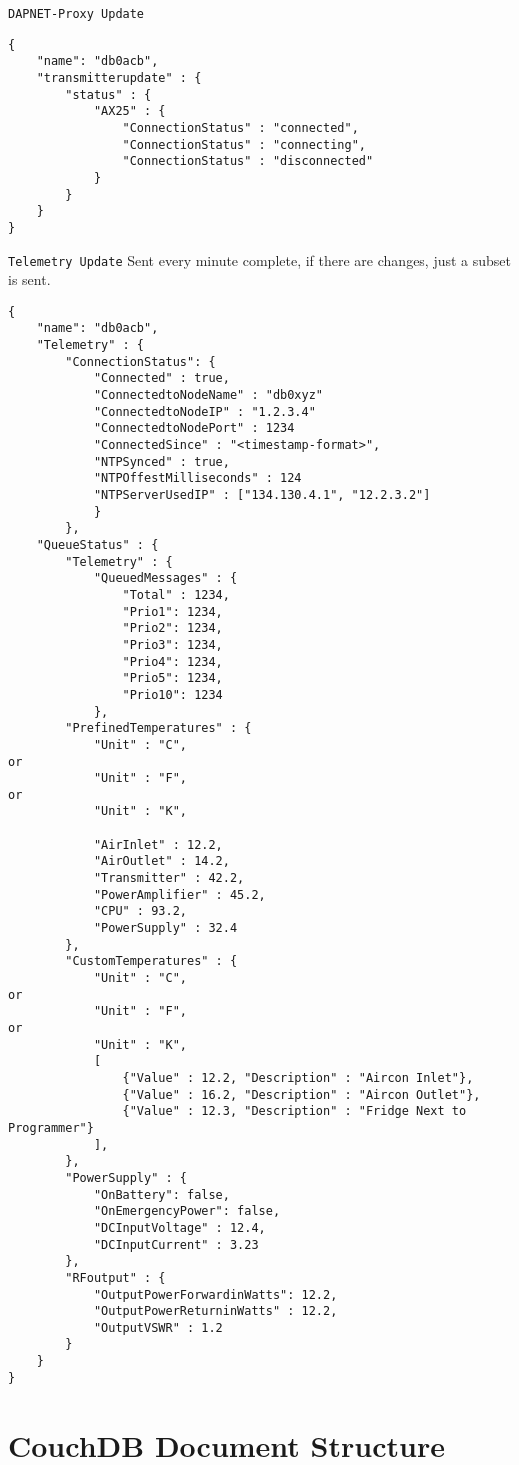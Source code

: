 \documentclass[a4paper]{article}
\begin{document}
\texttt{DAPNET-Proxy Update}
\begin{lstlisting}
{
    "name": "db0acb",
    "transmitterupdate" : {
        "status" : {
            "AX25" : {
                "ConnectionStatus" : "connected",
                "ConnectionStatus" : "connecting",
                "ConnectionStatus" : "disconnected"
            }
        }
    }
}
\end{lstlisting}

\texttt{Telemetry Update}
Sent every minute complete, if there are changes, just a subset is sent.
\begin{lstlisting}
{
    "name": "db0acb",
    "Telemetry" : {
        "ConnectionStatus": {
            "Connected" : true,
            "ConnectedtoNodeName" : "db0xyz"
            "ConnectedtoNodeIP" : "1.2.3.4"
            "ConnectedtoNodePort" : 1234
            "ConnectedSince" : "<timestamp-format>",
	    	"NTPSynced" : true,
            "NTPOffestMilliseconds" : 124
            "NTPServerUsedIP" : ["134.130.4.1", "12.2.3.2"]
            }
        },
    "QueueStatus" : {
        "Telemetry" : {
            "QueuedMessages" : {
                "Total" : 1234,
                "Prio1": 1234,
                "Prio2": 1234,
                "Prio3": 1234,
                "Prio4": 1234,
                "Prio5": 1234,
                "Prio10": 1234
            },
        "PrefinedTemperatures" : {
            "Unit" : "C",
or
            "Unit" : "F",
or
            "Unit" : "K",
         
            "AirInlet" : 12.2,
            "AirOutlet" : 14.2,
            "Transmitter" : 42.2,
            "PowerAmplifier" : 45.2,
            "CPU" : 93.2,
            "PowerSupply" : 32.4
        },
        "CustomTemperatures" : {
            "Unit" : "C",
or
            "Unit" : "F",
or
            "Unit" : "K",
            [
                {"Value" : 12.2, "Description" : "Aircon Inlet"},
                {"Value" : 16.2, "Description" : "Aircon Outlet"},
                {"Value" : 12.3, "Description" : "Fridge Next to Programmer"}
            ],
        },
        "PowerSupply" : {
            "OnBattery": false,
            "OnEmergencyPower": false,
            "DCInputVoltage" : 12.4,
            "DCInputCurrent" : 3.23
        },
        "RFoutput" : {
            "OutputPowerForwardinWatts": 12.2,
            "OutputPowerReturninWatts" : 12.2,
            "OutputVSWR" : 1.2
        }
    }
}
\end{lstlisting}
\section{CouchDB Document Structure}
\end{document}
